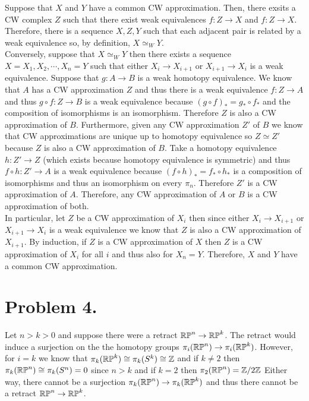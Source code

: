 \documentclass[12pt]{extarticle}
\begin{document}
Suppose that $X$ and $Y$ have a common CW approximation. Then, there exsits a CW complex $Z$ such that there exist weak equivalences $f : Z \to X$ and $f : Z \to X$. Therefore, there is a sequence $X, Z, Y$ such that each adjacent pair is related by a weak equivalence so, by definition, $X \simeq_W Y$.  \bigskip\\
Conversely, suppose that $X \simeq_W Y$ then there exists a sequence $X = X_1, X_2, \cdots, X_n = Y$ such that either $X_i \to X_{i+1}$ or $X_{i+1} \to X_i$ is a weak equivalence. Suppose that $g : A \to B$ is a weak homotopy equivalence. We know that $A$ has a CW approximation $Z$ and thus there is a weak equivalence $f : Z \to A$ and thus $g \circ f : Z \to B$ is a weak equivalence because $(g \circ f)_* = g_* \circ f_*$ and the composition of isomorphisms is an isomorphism. Therefore $Z$ is also a CW approximation of $B$. Furthermore, given any CW approximation $Z'$ of $B$ we know that CW approximations are unique up to homotopy equivalence so $Z \simeq Z'$ because $Z$ is also a CW approximation of $B$. Take a homotopy equivalence $h : Z' \to Z$ (which exists because homotopy equivalence is symmetric) and thus $f \circ h : Z' \to A$ is a weak equivalence because $(f \circ h)_* = f_* \circ h_*$ is a composition of isomorphisms and thus an isomorphism on every $\pi_n$. Therefore $Z'$ is a CW approximation of $A$. Therefore, any CW approximation of $A$ or $B$ is a CW approximation of both. \bigskip\\
In particular, let $Z$ be a CW approximation of $X_i$ then since either $X_{i} \to X_{i+1}$ or $X_{i+1} \to X_{i}$ is a weak equivalence we know that $Z$ is also a CW approximation of $X_{i+1}$. By induction, if $Z$ is a CW approximation of $X$ then $Z$ is a CW approximation of $X_{i}$ for all $i$ and thus also for $X_n = Y$. Therefore, $X$ and $Y$ have a common CW approximation.  

\section*{Problem 4.}

Let $n > k > 0$ and suppose there were a retract $\mathbb{RP}^n \to \mathbb{RP}^k$. The retract would induce a surjection on the the homotopy groups $\pi_i(\mathbb{RP}^n) \to \pi_i(\mathbb{RP}^k)$. However, for $i = k$ we know that $\pi_k(\mathbb{RP}^k) \cong \pi_k(S^k) \cong \mathbb{Z}$ and if $k \neq 2$ then $\pi_k(\mathbb{RP}^n) \cong \pi_k(S^n) = 0$ since $n > k$ and if $k = 2$ then $\pi_2(\mathbb{RP}^n) = \mathbb{Z}/2\mathbb{Z}$ Either way, there cannot be a surjection $\pi_k(\mathbb{RP}^n) \to \pi_k(\mathbb{RP}^k)$ and thus there cannot be a retract $\mathbb{RP}^n \to \mathbb{RP}^k$. 
\end{document}
